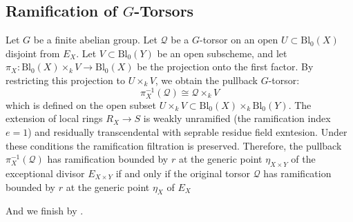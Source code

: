 \subsection*{Ramification of $G$-Torsors}
Let $G$ be a finite abelian group. 
Let $\mathcal{Q}$ be a $G$-torsor on an open $U \subset \text{Bl}_0(X)$ disjoint from $E_X$. 
Let $V \subset \text{Bl}_0(Y)$ be an open subscheme, and let $\pi_X: \text{Bl}_0(X) \times_k V \to \text{Bl}_0(X)$ 
be the projection onto the first factor. 
By restricting this projection to $U \times_k V$, we obtain the pullback $G$-torsor:
$$\pi_X^{-1}(\mathcal{Q}) \cong \mathcal{Q} \times_k V$$
which is defined on the open subset $U \times_k V \subset \text{Bl}_0(X) \times_k \text{Bl}_0(Y)$.
The extension of local rings $R_X \to S$ is weakly unramified (the ramification index $e=1$) and residually transcendental with seprable residue field exntesion. 
Under these conditions the ramification filtration is preserved. 
Therefore, the pullback $\pi_X^{-1}(\mathcal{Q})$ has ramification bounded by $r$ at the generic point $\eta_{X \times Y}$ of the exceptional divisor $E_{X \times Y}$ if and only if 
the original torsor $\mathcal{Q}$ has ramification bounded by $r$ at the generic point $\eta_X$ of $E_X$

And we finish by .

